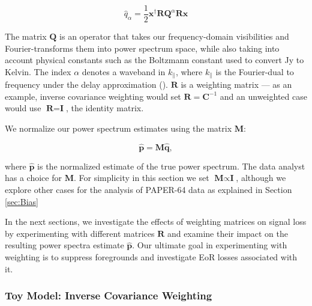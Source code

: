 \documentclass[preprint2,numberedappendix,tighten]{aastex6}  %
\begin{document}
\begin{equation}
\label{eq:qhat}
\hat{q}_{\alpha} = \frac{1}{2}\textbf{x}^{\dagger}\textbf{R}\textbf{Q}^{\alpha}\textbf{R}\textbf{x}
\end{equation}

\noindent The matrix $\textbf{Q}$ is an operator that takes our frequency-domain visibilities and Fourier-transforms them into power spectrum space, while also taking into account physical constants such as the Boltzmann constant used to convert Jy to Kelvin. The index $\alpha$ denotes a waveband in $k_{\parallel}$, where $k_{\parallel}$ is the Fourier-dual to frequency under the delay approximation (\citealt{parsons_et_al2012b}). $\textbf{R}$ is a weighting matrix --- as an example, inverse covariance weighting would set $\textbf{R} = \textbf{C}^{-1}$ and an unweighted case would use $\textbf{R} = \textbf{I}$, the identity matrix.

We normalize our power spectrum estimates using the matrix $\textbf{M}$:

\begin{equation}
\label{eq:phat}
\hat{\textbf{p}} = \textbf{M}\hat{\textbf{q}},
\end{equation}

\noindent where $\hat{\textbf{p}}$ is the normalized estimate of the true power spectrum. The data analyst has a choice for $\textbf{M}$. For simplicity in this section we set $\textbf{M} \propto \textbf{I}$, although we explore other cases for the analysis of PAPER-64 data as explained in Section \ref{sec:Bias}

In the next sections, we investigate the effects of weighting matrices on signal loss by experimenting with different matrices $\textbf{R}$ and examine their impact on the resulting power spectra estimate $\hat{\textbf{p}}$. Our ultimate goal in experimenting with weighting is to suppress foregrounds and investigate EoR losses associated with it.

\subsubsection{Toy Model: Inverse Covariance Weighting}
\label{sec:toymodel}
\end{document}
